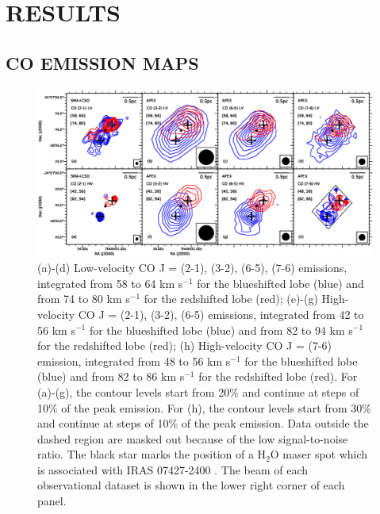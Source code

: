 \section{RESULTS}
\subsection{CO EMISSION MAPS}

\begin{figure}[htbp]
\includegraphics[scale=.65]{./fig/ori_contourall.eps}
\caption{(a)-(d) Low-velocity CO J = (2-1), (3-2), (6-5), (7-6) emissions, integrated from 58 to 64 km s$^{-1} $ for the blueshifted lobe (blue) and from 74 to 80 km s$^{-1}$ for the redshifted lobe (red); (e)-(g) High-velocity CO J = (2-1), (3-2), (6-5) emissions,  integrated from 42 to 56 km s$^{-1} $ for the blueshifted lobe (blue) and from 82 to 94 km s$^{-1}$ for the redshifted lobe (red); (h) High-velocity CO J = (7-6) emission, integrated from 48 to 56 km s$^{-1} $ for the blueshifted lobe (blue) and from 82 to 86 km s$^{-1}$ for the redshifted lobe (red). For (a)-(g), the contour levels start from 20\% and continue at steps of 10\% of the peak emission. For (h), the contour levels start from 30\% and continue at steps of 10\% of the peak emission. Data outside the dashed region are masked out because of the low signal-to-noise ratio. The black star marks the position of a H$_2$O maser spot which is associated with IRAS 07427-2400 \citep{2015PASJ...67...69S}. The beam of each observational dataset is shown in the lower right corner of each panel. \label{fig1}}
\end{figure}

